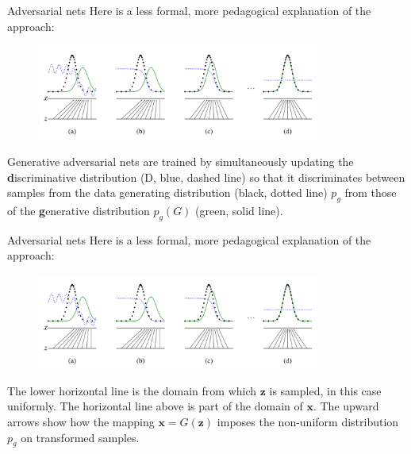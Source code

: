\documentclass[10pt]{beamer}
\begin{document}
	\begin{frame}[t]{Adversarial nets}
		\onslide<1->
		Here is a less formal, more pedagogical explanation of the approach:
		\onslide<2->
		\begin{figure}
			\includegraphics<2->[width=25em]{figures/GAN-pedagogical-explanation.png}
		\end{figure}
		Generative adversarial nets are trained by simultaneously updating the \textbf{d}iscriminative distribution (D, blue, dashed line) so that it discriminates between samples from the data generating distribution (black, dotted line) $p_g$ from those of the \textbf{g}enerative distribution $p_g(G)$ (green, solid line). 
	\end{frame}
	
	\begin{frame}[t]{Adversarial nets}
		Here is a less formal, more pedagogical explanation of the approach:
		\begin{figure}
			\includegraphics[width=25em]{figures/GAN-pedagogical-explanation.png}
		\end{figure}
	 	The lower horizontal line is the domain from which $\bm{z}$ is sampled, in this case uniformly. The horizontal line above is part of the domain of $\bm{x}$. The upward arrows show how the mapping $\bm{x}=G(\bm{z})$ imposes the non-uniform distribution $p_g$ on transformed samples.
	\end{frame}
\end{document}
